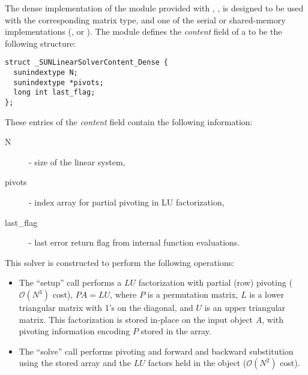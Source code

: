 
The dense implementation of the {\sunlinsol} module provided with
{\sundials}, {\sunlinsoldense}, is designed to be used with the
corresponding {\sunmatdense} matrix type, and one of the serial or
shared-memory {\nvector} implementations ({\nvecs}, {\nvecopenmp} or
{\nvecpthreads}).  The {\sunlinsoldense} module defines the {\em
content} field of a  to be the following structure:
\begin{verbatim} 
struct _SUNLinearSolverContent_Dense {
  sunindextype N;
  sunindextype *pivots;
  long int last_flag;
};
\end{verbatim}
These entries of the \emph{content} field contain the following
information:
\begin{description}
  \item[N] - size of the linear system,
  \item[pivots] - index array for partial pivoting in LU factorization,
  \item[last\_flag] - last error return flag from internal function evaluations.
\end{description}

This solver is constructed to perform the following operations:
\begin{itemize}
\item The ``setup'' call performs a $LU$ factorization with
  partial (row) pivoting ($\mathcal O(N^3)$ cost), $PA=LU$, where $P$
  is a permutation matrix, $L$ is a lower triangular matrix with 1's
  on the diagonal, and $U$ is an upper triangular matrix.  This
  factorization is stored in-place on the input {\sunmatdense} object
  $A$, with pivoting information encoding $P$ stored in
  the  array.
\item The ``solve'' call performs pivoting and forward and
  backward substitution using the stored  array and the
  $LU$ factors held in the {\sunmatdense} object ($\mathcal O(N^2)$
  cost).
\end{itemize}

